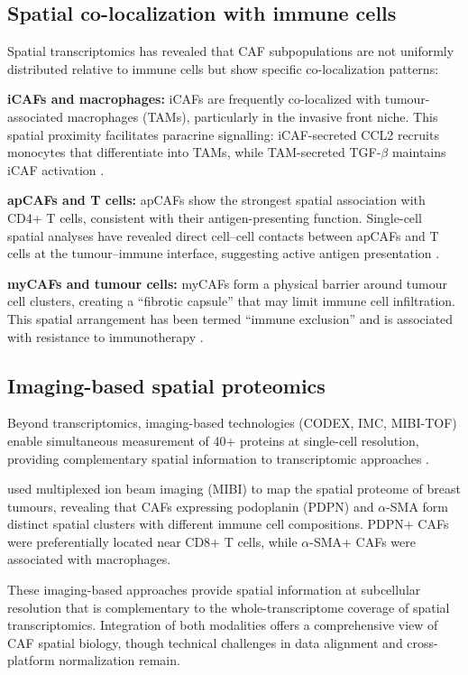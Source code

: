 \subsection{Spatial co-localization with immune cells}

Spatial transcriptomics has revealed that CAF subpopulations are not uniformly distributed relative to immune cells but show specific co-localization patterns:

\textbf{iCAFs and macrophages:} iCAFs are frequently co-localized with tumour-associated macrophages (TAMs), particularly in the invasive front niche. This spatial proximity facilitates paracrine signalling: iCAF-secreted CCL2 recruits monocytes that differentiate into TAMs, while TAM-secreted TGF-$\beta$ maintains iCAF activation \citep{qian2011}.

\textbf{apCAFs and T cells:} apCAFs show the strongest spatial association with CD4+ T cells, consistent with their antigen-presenting function. Single-cell spatial analyses have revealed direct cell--cell contacts between apCAFs and T cells at the tumour--immune interface, suggesting active antigen presentation \citep{erve2024}.

\textbf{myCAFs and tumour cells:} myCAFs form a physical barrier around tumour cell clusters, creating a ``fibrotic capsule'' that may limit immune cell infiltration. This spatial arrangement has been termed ``immune exclusion'' and is associated with resistance to immunotherapy \citep{chhabra2023}.

\subsection{Imaging-based spatial proteomics}

Beyond transcriptomics, imaging-based technologies (CODEX, IMC, MIBI-TOF) enable simultaneous measurement of 40+ proteins at single-cell resolution, providing complementary spatial information to transcriptomic approaches \citep{goltsev2018deep}.

\citet{keren2018structured} used multiplexed ion beam imaging (MIBI) to map the spatial proteome of breast tumours, revealing that CAFs expressing podoplanin (PDPN) and $\alpha$-SMA form distinct spatial clusters with different immune cell compositions. PDPN+ CAFs were preferentially located near CD8+ T cells, while $\alpha$-SMA+ CAFs were associated with macrophages.

These imaging-based approaches provide spatial information at subcellular resolution that is complementary to the whole-transcriptome coverage of spatial transcriptomics. Integration of both modalities offers a comprehensive view of CAF spatial biology, though technical challenges in data alignment and cross-platform normalization remain.

